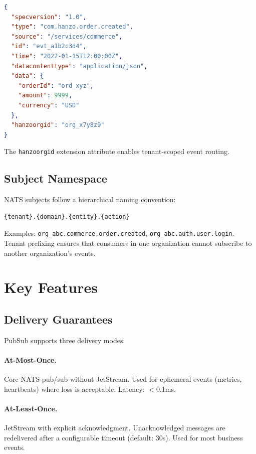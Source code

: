 \documentclass[11pt,twocolumn]{article}
\begin{document}
\begin{lstlisting}[language=JSON]
{
  "specversion": "1.0",
  "type": "com.hanzo.order.created",
  "source": "/services/commerce",
  "id": "evt_a1b2c3d4",
  "time": "2022-01-15T12:00:00Z",
  "datacontenttype": "application/json",
  "data": {
    "orderId": "ord_xyz",
    "amount": 9999,
    "currency": "USD"
  },
  "hanzoorgid": "org_x7y8z9"
}
\end{lstlisting}

The \texttt{hanzoorgid} extension attribute enables tenant-scoped event routing.

\subsection{Subject Namespace}

NATS subjects follow a hierarchical naming convention:

\begin{verbatim}
{tenant}.{domain}.{entity}.{action}
\end{verbatim}

Examples: \texttt{org\_abc.commerce.order.created}, \texttt{org\_abc.auth.user.login}. Tenant prefixing ensures that consumers in one organization cannot subscribe to another organization's events.

\section{Key Features}

\subsection{Delivery Guarantees}

PubSub supports three delivery modes:

\paragraph{At-Most-Once.} Core NATS pub/sub without JetStream. Used for ephemeral events (metrics, heartbeats) where loss is acceptable. Latency: $<$0.1ms.

\paragraph{At-Least-Once.} JetStream with explicit acknowledgment. Unacknowledged messages are redelivered after a configurable timeout (default: 30s). Used for most business events.
\end{document}
